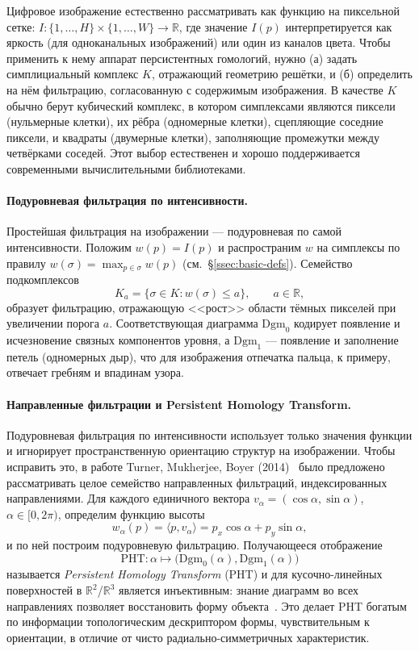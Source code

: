 Цифровое изображение естественно рассматривать как функцию на пиксельной сетке: $I: \{1, \dots, H\} \times \{1, \dots, W\} \to \mathbb{R}$, где значение $I(p)$ интерпретируется как яркость (для одноканальных изображений) или один из каналов цвета. Чтобы применить к нему аппарат персистентных гомологий, нужно (а) задать симплициальный комплекс $K$, отражающий геометрию решётки, и (б) определить на нём фильтрацию, согласованную с содержимым изображения. В качестве $K$ обычно берут кубический комплекс, в котором симплексами являются пиксели (нульмерные клетки), их рёбра (одномерные клетки), сцепляющие соседние пиксели, и квадраты (двумерные клетки), заполняющие промежутки между четвёрками соседей. Этот выбор естественен и хорошо поддерживается современными вычислительными библиотеками.

\paragraph{Подуровневая фильтрация по интенсивности.}
Простейшая фильтрация на изображении --- подуровневая по самой интенсивности. Положим $w(p) = I(p)$ и распространим $w$ на симплексы по правилу $w(\sigma) = \max_{p \in \sigma} w(p)$ (см.\ §\ref{ssec:basic-defs}). Семейство подкомплексов
\[
K_a = \{\sigma \in K : w(\sigma) \le a\}, \qquad a \in \mathbb{R},
\]
образует фильтрацию, отражающую <<рост>> области тёмных пикселей при увеличении порога $a$. Соответствующая диаграмма $\mathrm{Dgm}_0$ кодирует появление и исчезновение связных компонентов уровня, а $\mathrm{Dgm}_1$ --- появление и заполнение петель (одномерных дыр), что для изображения отпечатка пальца, к примеру, отвечает гребням и впадинам узора.

\paragraph{Направленные фильтрации и Persistent Homology Transform.}
Подуровневая фильтрация по интенсивности использует только значения функции и игнорирует пространственную ориентацию структур на изображении. Чтобы исправить это, в работе Turner, Mukherjee, Boyer (2014)~\cite{turnerPersistentHomologyTransform2014} было предложено рассматривать целое семейство направленных фильтраций, индексированных направлениями. Для каждого единичного вектора $v_\alpha = (\cos\alpha, \sin\alpha)$, $\alpha \in [0, 2\pi)$, определим функцию высоты
\[
w_\alpha(p) = \langle p, v_\alpha \rangle = p_x \cos\alpha + p_y \sin\alpha,
\]
и по ней построим подуровневую фильтрацию. Получающееся отображение
\[
\mathrm{PHT}: \alpha \mapsto \bigl( \mathrm{Dgm}_0(\alpha), \mathrm{Dgm}_1(\alpha) \bigr)
\]
называется \emph{Persistent Homology Transform} (PHT) и для кусочно-линейных поверхностей в $\mathbb{R}^2$/$\mathbb{R}^3$ является инъективным: знание диаграмм во всех направлениях позволяет восстановить форму объекта~\cite{turnerPersistentHomologyTransform2014}. Это делает PHT богатым по информации топологическим дескриптором формы, чувствительным к ориентации, в отличие от чисто радиально-симметричных характеристик.

